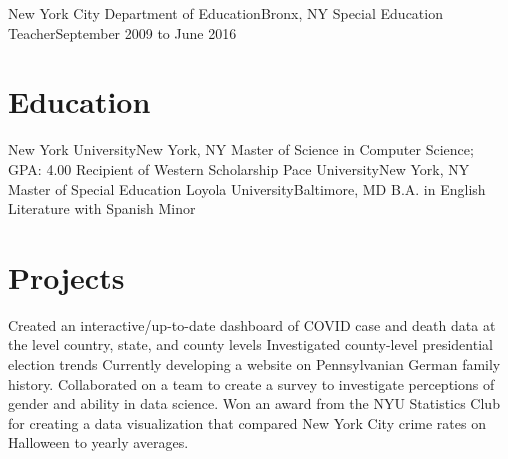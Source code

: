\documentclass[letterpaper,11pt]{article}
\begin{document}
	\resumeSubheading
	{New York City Department of Education}{Bronx, NY}
	{Special Education Teacher}{September 2009 to June 2016}
		\resumeItemListStart
		\resumeItemListEnd
	\resumeSubHeadingListEnd

\section{Education}
	\resumeSubHeadingListStart
   		\resumeSubheadingAward
      		{New York University}{New York, NY}
      		{Master of Science in Computer Science;  GPA: 4.00}{}
      		{Recipient of Western Scholarship}{}
      	\resumeSubheading
      		{Pace University}{New York, NY}
      		{Master of Special Education} {}
      	\resumeSubheading
      		{Loyola University}{Baltimore, MD}
      		{B.A. in English Literature with Spanish Minor}{}
    \resumeSubHeadingListEnd

\section{Projects}
\resumeItemListStart
				 {Created an interactive/up-to-date dashboard of COVID case and death data at the level country, state, and county levels}
				 {Investigated county-level presidential election trends}
				{Currently developing a website on Pennsylvanian German family history.}
				{Collaborated on a team to create a survey to investigate perceptions of gender and ability in data science.}
				 {Won an award from the NYU Statistics Club for creating a data visualization that compared New York City crime rates on Halloween to yearly averages.}

\resumeItemListEnd
\end{document}
